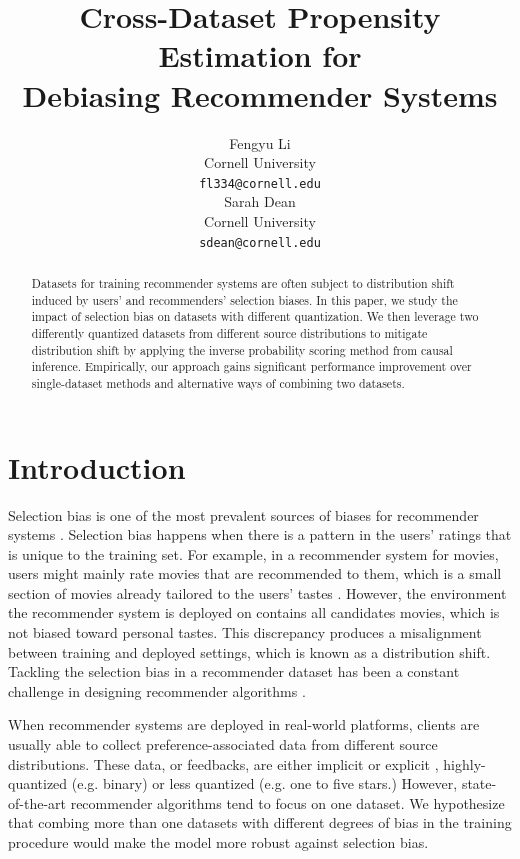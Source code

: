 \documentclass{article}
\title{Cross-Dataset Propensity Estimation for \\Debiasing Recommender Systems}
\author{%
  Fengyu Li \\
  Cornell University\\
  \texttt{fl334@cornell.edu} \\
  \And
  Sarah Dean \\
  Cornell University \\
  \texttt{sdean@cornell.edu} \\
}
\begin{document}
\maketitle


\begin{abstract}
  Datasets for training recommender systems are often subject to distribution shift induced by users' and recommenders' selection biases. In this paper, we study the impact of selection bias on datasets with different quantization. We then leverage two differently quantized datasets from different source distributions to mitigate distribution shift by applying the inverse probability scoring method from causal inference. Empirically, our approach gains significant performance improvement over single-dataset methods and alternative ways of combining two datasets. 
\end{abstract}

\section{Introduction}
Selection bias is one of the most prevalent sources of biases for recommender systems \cite{chen2020bias}. Selection bias happens when there is a pattern in the users' ratings that is unique to the training set. For example, in a recommender system for movies, users might mainly rate movies that are recommended to them, which is a small section of movies already tailored to the users' tastes \cite{pradel2012ranking}. However, the environment the recommender system is deployed on contains all candidates movies, which is not biased toward personal tastes. This discrepancy produces a misalignment between training and deployed settings, which is known as a distribution shift. Tackling the selection bias in a recommender dataset has been a constant challenge in designing recommender algorithms \cite{schnabel2016recommendations}.

When recommender systems are deployed in real-world platforms, clients are usually able to collect preference-associated data from different source distributions. These data, or feedbacks, are either implicit or explicit \cite{aggarwal2016recommender}, highly-quantized (e.g. binary) or less quantized (e.g. one to five stars.) However, state-of-the-art recommender algorithms tend to focus on one dataset. We hypothesize that combing more than one datasets with different degrees of bias in the training procedure would make the model more robust against selection bias.
\end{document}
